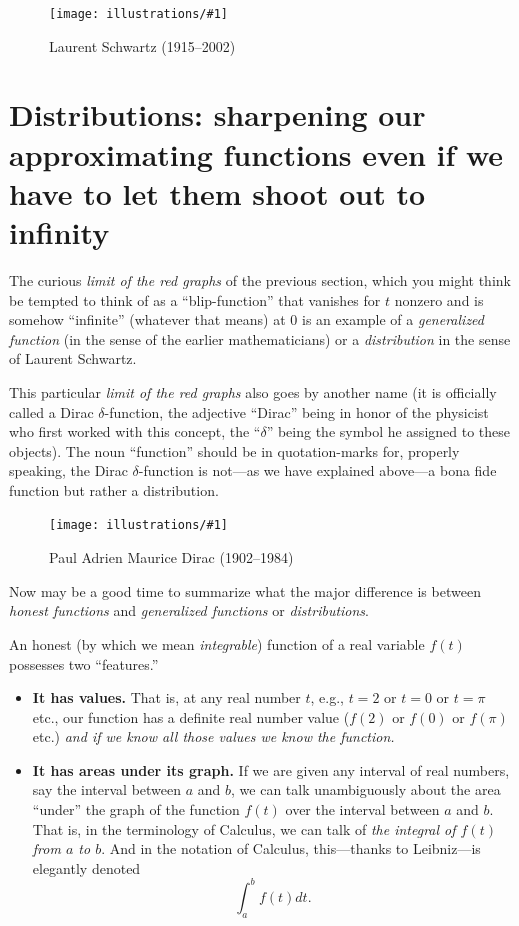 \documentclass[11pt]{article}
\newcommand{\ill}[3]{ 
   \begin{figure}[H]
   \begin{center}
   \texttt{[image: illustrations/\#1]}
   \caption{#3}
   \end{center}
    \end{figure}
}
\theoremstyle{plain}
\theoremstyle{definition}
\numberwithin{equation}{section}
\numberwithin{figure}{section}
\numberwithin{table}{section}
\begin{document}
 \ill{schwartz}{.3}{Laurent Schwartz (1915--2002)} 



\section{Distributions: sharpening our approximating functions even if
  we have to let them shoot out to infinity}
  


The curious {\it limit of the red graphs} of the previous section, which you might think be tempted to think of as a ``blip-function'' that vanishes for $t$ nonzero and is somehow ``infinite'' (whatever that means) at $0$ is an example of a {\it generalized function} (in the sense of the earlier mathematicians) or a {\it distribution} in the sense of Laurent Schwartz.

  This particular {\it limit of the red graphs} also goes by another  name (it is officially called a Dirac $\delta$-function,
the adjective ``Dirac'' being in honor of the physicist who first worked  with this concept, the ``$\delta$'' being the symbol he assigned to these objects). The noun ``function'' should 
be in quotation-marks for, properly speaking, the Dirac $\delta$-function is not---as we have explained
above---a bona fide function but rather a distribution.
      
      \ill{dirac}{0.3}{Paul Adrien Maurice Dirac (1902--1984)}

     
Now may be  a good time to summarize what the major difference is between {\it honest functions} and {\it generalized functions}  or  {\it distributions}.

An honest (by which we mean {\it integrable}) function of a real variable  $f(t)$ possesses two ``features.''


\begin{itemize}
\item  {\bf It has values.}  That is, at any real number $t$,  e.g., $t =2$ or $t =0$ or $t =\pi$ etc., our function has a definite real number value ($f(2)$ or $f(0)$ or $f(\pi)$ etc.) {\it and if we know all those values we know the function.}
     
\item  {\bf It has areas under its graph.} If we are given any interval of real numbers, say the interval between $a$ and $b$, we can talk unambiguously about the area ``under'' the graph of the function $f(t)$ over the interval  between $a$ and $b$.  That is, in the terminology of Calculus, we can talk of  {\it the integral of $f(t)$ from $a$ to $b$}.  And in the notation of Calculus, this---thanks to Leibniz---is elegantly  denoted     
$$\int_a^bf(t)dt.$$

\end{itemize}
\end{document}
